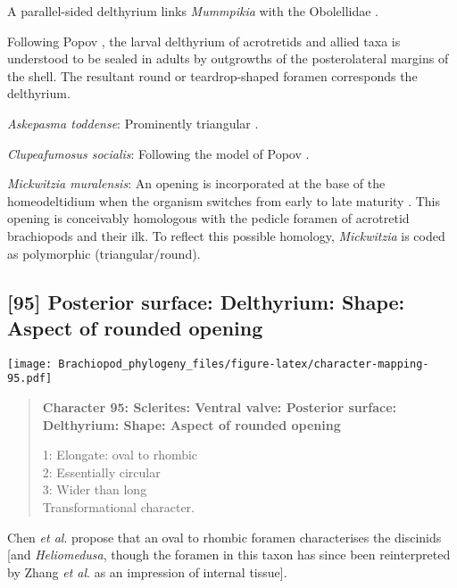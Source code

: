 \documentclass[openany]{book}
\theoremstyle{definition}
\theoremstyle{definition}
\theoremstyle{definition}
\theoremstyle{remark}
\begin{document}
A parallel-sided delthyrium links \emph{Mummpikia} with the Obolellidae
\citep{Balthasar2008iMummpikia}.

Following Popov \citeyearpar{Popov1992TheCambrian}, the larval
delthyrium of acrotretids and allied taxa is understood to be sealed in
adults by outgrowths of the posterolateral margins of the shell. The
resultant round or teardrop-shaped foramen corresponds the delthyrium.

\hypertarget{Askepasma_toddense-coding-94}{}
\emph{Askepasma toddense}: Prominently triangular \citep[see][fig.
2]{Topper2013Theoldest}.

\hypertarget{Clupeafumosus_socialis-coding-94}{}
\emph{Clupeafumosus socialis}: Following the model of Popov
\citeyearpar{Popov1992TheCambrian}.

\hypertarget{Mickwitzia_muralensis-coding-94}{}
\emph{Mickwitzia muralensis}: An opening is incorporated at the base of
the homeodeltidium when the organism switches from early to late
maturity \citep[fig. 10 in][]{Balthasar2004Shellstructure}. This opening
is conceivably homologous with the pedicle foramen of acrotretid
brachiopods and their ilk. To reflect this possible homology,
\emph{Mickwitzia} is coded as polymorphic (triangular/round).

\subsection*{{[}95{]} Posterior surface: Delthyrium: Shape: Aspect of
rounded
opening}\label{posterior-surface-delthyrium-shape-aspect-of-rounded-opening}

\texttt{[image: Brachiopod\_phylogeny\_files/figure-latex/character-mapping-95.pdf]}

\begin{quote}
\textbf{Character 95: Sclerites: Ventral valve: Posterior surface:
Delthyrium: Shape: Aspect of rounded opening}

1: Elongate: oval to rhombic\\
2: Essentially circular\\
3: Wider than long\\
Transformational character.
\end{quote}

Chen \emph{et al}. \citeyearpar{Chen2007Reinterpretationof} propose that
an oval to rhombic foramen characterises the discinids {[}and
\emph{Heliomedusa}, though the foramen in this taxon has since been
reinterpreted by Zhang \emph{et al}.
\citeyearpar{Zhang2009Architectureand} as an impression of internal
tissue{]}.
\end{document}
